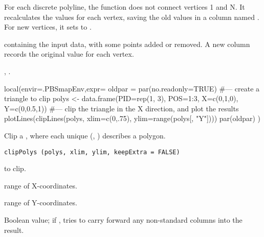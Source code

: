 \documentclass[letterpaper]{book}
\begin{document}
%
\begin{Details}\relax
For each discrete polyline, the function does not connect vertices 1
and N.  It recalculates the  values for each vertex, saving
the old values in a column named .  For new vertices, it
sets  to .
\end{Details}
%
\begin{Value}
 containing the input data, with some points added or
removed.  A new column  records the original 
value for each vertex.
\end{Value}
%
\begin{SeeAlso}\relax
{},
.
\end{SeeAlso}
%
\begin{Examples}
\begin{ExampleCode}
local(envir=.PBSmapEnv,expr={
  oldpar = par(no.readonly=TRUE)
  #--- create a triangle to clip
  polys <- data.frame(PID=rep(1, 3), POS=1:3, X=c(0,1,0), Y=c(0,0.5,1))
  #--- clip the triangle in the X direction, and plot the results
  plotLines(clipLines(polys, xlim=c(0,.75), ylim=range(polys[, "Y"])))
  par(oldpar)
})
\end{ExampleCode}
\end{Examples}
%
\begin{Description}\relax
Clip a , where each unique (, ) describes
a polygon.
\end{Description}
%
\begin{Usage}
\begin{verbatim}
clipPolys (polys, xlim, ylim, keepExtra = FALSE)
\end{verbatim}
\end{Usage}
%
\begin{Arguments}
\begin{ldescription}
\item[\code{polys}]  to clip.
\item[\code{xlim}] range of X-coordinates.
\item[\code{ylim}] range of Y-coordinates.
\item[\code{keepExtra}] Boolean value; if , tries to
carry forward any non-standard columns into the result.
\end{ldescription}
\end{Arguments}
\end{document}
